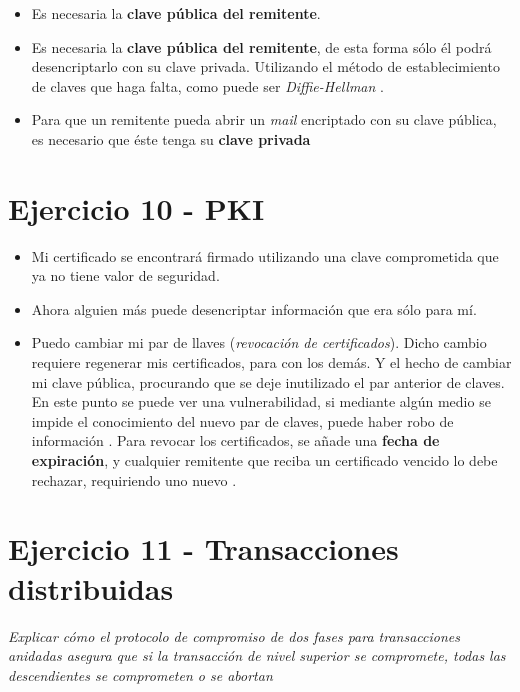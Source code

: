 \begin{itemize}
    \item Es necesaria la \textbf{clave pública del remitente}.
    \item Es necesaria la \textbf{clave pública del remitente}, de esta forma sólo él podrá desencriptarlo con su clave privada. Utilizando el método de establecimiento de claves que haga falta, como puede ser \emph{Diffie-Hellman} \autocite{WikipediaEmailEncryption}.
    \item Para que un remitente pueda abrir un \emph{mail} encriptado con su clave pública, es necesario que éste tenga su \textbf{clave privada} 
\end{itemize}

\section{Ejercicio 10 - PKI}

\begin{itemize}
    \item Mi certificado se encontrará firmado utilizando una clave comprometida que ya no tiene valor de seguridad. 
    \item Ahora alguien más puede desencriptar información que era sólo para mí.
    \item Puedo cambiar mi par de llaves (\emph{revocación de certificados}). Dicho cambio requiere regenerar mis certificados, para con los demás. Y el hecho de cambiar mi clave pública, procurando que se deje inutilizado el par anterior de claves. En este punto se puede ver una vulnerabilidad, si mediante algún medio se impide el conocimiento del nuevo par de claves, puede haber robo de información \autocite{WikipediaPublicKeyCertificate}. Para revocar los certificados, se añade una \textbf{fecha de expiración}, y cualquier remitente que reciba un certificado vencido lo debe rechazar, requiriendo uno nuevo \autocite{ColourisCertificates}. 
\end{itemize}

\section{Ejercicio 11 - Transacciones distribuidas}

\emph{Explicar cómo el protocolo de compromiso de dos fases para transacciones anidadas asegura que si la transacción de nivel superior se compromete, todas las descendientes se comprometen o se abortan} 
~\\

